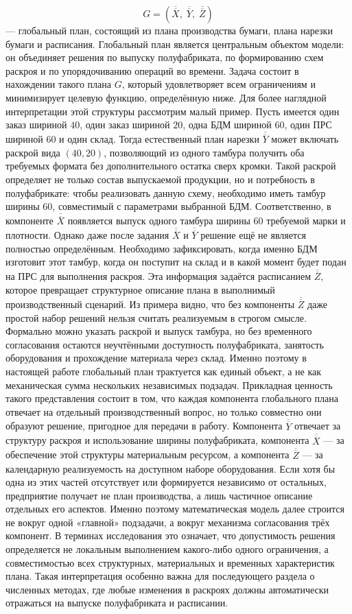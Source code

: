 \[
G = (\overline{\overline{X}},\;\overline{\overline{Y}},\;\overline{\overline{Z}})
\]
--- глобальный план, состоящий из плана производства бумаги, плана нарезки бумаги и расписания.
Глобальный план является центральным объектом модели: он объединяет решения по выпуску полуфабриката, по формированию схем раскроя и по упорядочиванию операций во времени.
Задача состоит в нахождении такого плана $G$, который удовлетворяет всем ограничениям и минимизирует целевую функцию, определённую ниже.
Для более наглядной интерпретации этой структуры рассмотрим малый пример. Пусть имеется один заказ шириной $40$, один заказ шириной $20$, одна БДМ шириной $60$, один ПРС шириной $60$ и один склад. Тогда естественный план нарезки $\overline{\overline{Y}}$ может включать раскрой вида $(40,20)$, позволяющий из одного тамбура получить оба требуемых формата без дополнительного остатка сверх кромки. Такой раскрой определяет не только состав выпускаемой продукции, но и потребность в полуфабрикате: чтобы реализовать данную схему, необходимо иметь тамбур ширины $60$, совместимый с параметрами выбранной БДМ.
Соответственно, в компоненте $\overline{\overline{X}}$ появляется выпуск одного тамбура ширины $60$ требуемой марки и плотности. Однако даже после задания $\overline{\overline{X}}$ и $\overline{\overline{Y}}$ решение ещё не является полностью определённым. Необходимо зафиксировать, когда именно БДМ изготовит этот тамбур, когда он поступит на склад и в какой момент будет подан на ПРС для выполнения раскроя. Эта информация задаётся расписанием $\overline{\overline{Z}}$, которое превращает структурное описание плана в выполнимый производственный сценарий.
Из примера видно, что без компоненты $\overline{\overline{Z}}$ даже простой набор решений нельзя считать реализуемым в строгом смысле. Формально можно указать раскрой и выпуск тамбура, но без временного согласования остаются неучтёнными доступность полуфабриката, занятость оборудования и прохождение материала через склад. Именно поэтому в настоящей работе глобальный план трактуется как единый объект, а не как механическая сумма нескольких независимых подзадач.
Прикладная ценность такого представления состоит в том, что каждая компонента глобального плана отвечает на отдельный производственный вопрос, но только совместно они образуют решение, пригодное для передачи в работу. Компонента $\overline{\overline{Y}}$ отвечает за структуру раскроя и использование ширины полуфабриката, компонента $\overline{\overline{X}}$ --- за обеспечение этой структуры материальным ресурсом, а компонента $\overline{\overline{Z}}$ --- за календарную реализуемость на доступном наборе оборудования. Если хотя бы одна из этих частей отсутствует или формируется независимо от остальных, предприятие получает не план производства, а лишь частичное описание отдельных его аспектов.
Именно поэтому математическая модель далее строится не вокруг одной «главной» подзадачи, а вокруг механизма согласования трёх компонент. В терминах исследования это означает, что допустимость решения определяется не локальным выполнением какого-либо одного ограничения, а совместимостью всех структурных, материальных и временных характеристик плана. Такая интерпретация особенно важна для последующего раздела о численных методах, где любые изменения в раскроях должны автоматически отражаться на выпуске полуфабриката и расписании.

